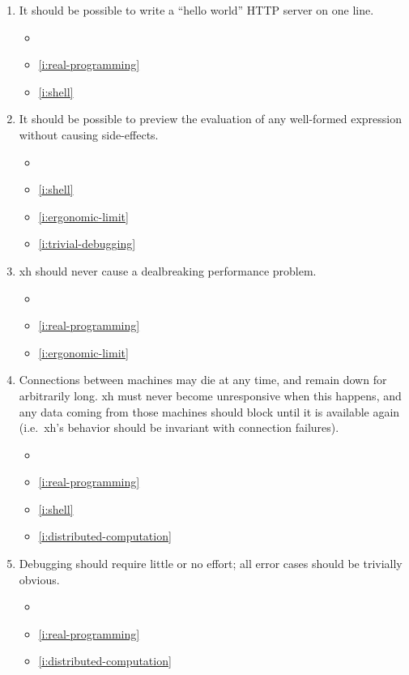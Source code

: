 \documentclass{report}
\makeatletter
\newcommand*{\Label}[2]{%
  \@bsphack
  \begingroup
    \label{#1-original}%
    \def\@currentlabel{#2 [\ref{#1-original}]}%
    \label{#1}%
  \endgroup
  \@esphack
}
\makeatother
\begin{document}
\begin{enumerate}
\item{}\Label{i:quick-webserver}{webserver}
  It should be possible to write a ``hello world'' HTTP server on one line.
\begin{itemize}
\item \initial
\item \ref{i:real-programming}
\item \ref{i:shell}
\end{itemize}
\item{}\Label{i:live-preview}{liveprev}
  It should be possible to preview the evaluation of any well-formed
  expression without causing side-effects.
\begin{itemize}
\item \initial
\item \ref{i:shell}
\item \ref{i:ergonomic-limit}
\item \ref{i:trivial-debugging}
\end{itemize}
\item{}\Label{i:not-slow}{notslow}
  xh should never cause a dealbreaking performance problem.
\begin{itemize}
\item \initial
\item \ref{i:real-programming}
\item \ref{i:ergonomic-limit}
\end{itemize}
\item{}\Label{i:unreliable-connections}{unreliable}
  Connections between machines may die at any time, and remain down for
  arbitrarily long. xh must never become unresponsive when this happens,
  and any data coming from those machines should block until it is
  available again (i.e.~xh's behavior should be invariant with connection
  failures).
\begin{itemize}
\item \initial
\item \ref{i:real-programming}
\item \ref{i:shell}
\item \ref{i:distributed-computation}
\end{itemize}
\item{}\Label{i:trivial-debugging}{nodebug}
  Debugging should require little or no effort; all error cases should be
  trivially obvious.
\begin{itemize}
\item \initial
\item \ref{i:real-programming}
\item \ref{i:distributed-computation}

\end{itemize}
\end{enumerate}
\end{document}
